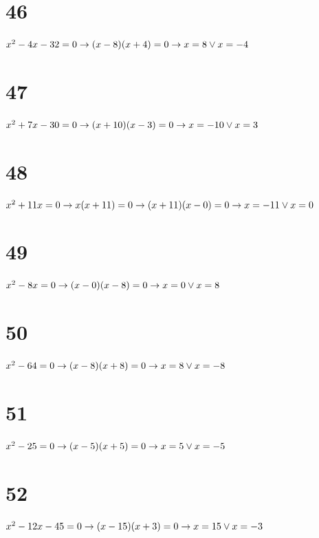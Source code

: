 \documentclass{article}
\theoremstyle{definition}
\begin{document}
\section*{46}
$x^2-4x-32=0\newline\rightarrow (x-8)(x+4)=0\newline\rightarrow x=8\vee x=-4$

\section*{47}
$x^2+7x-30=0\newline\rightarrow (x+10)(x-3)=0\newline\rightarrow x=-10\vee x=3$

\section*{48}
$x^2+11x=0\newline\rightarrow x(x+11)=0\newline\rightarrow (x+11)(x-0)=0\newline\rightarrow x=-11\vee x=0$

\section*{49}
$x^2-8x=0\newline\rightarrow (x-0)(x-8)=0\newline\rightarrow x=0\vee x=8$

\section*{50}
$x^2-64=0\newline\rightarrow (x-8)(x+8)=0\newline\rightarrow x=8\vee x=-8$

\section*{51}
$x^2-25=0\newline\rightarrow (x-5)(x+5)=0\newline\rightarrow x=5\vee x=-5$

\section*{52}
$x^2-12x-45=0\newline\rightarrow (x-15)(x+3)=0\newline\rightarrow x=15\vee x=-3$
\end{document}
